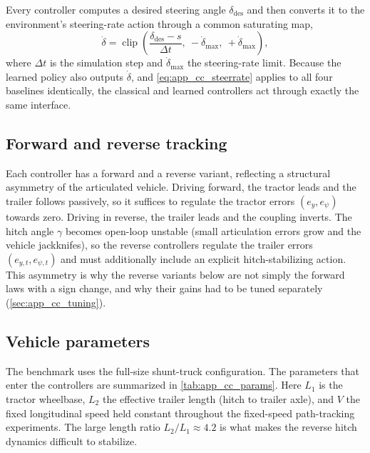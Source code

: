 Every controller computes a desired steering angle $\delta_{\mathrm{des}}$ and then
converts it to the environment's steering-rate action through a common saturating map,
\begin{equation}
    \dot{\delta} = \operatorname{clip}\!\left(\frac{\delta_{\mathrm{des}} - s}{\Delta t},\
    -\dot{\delta}_{\max},\ +\dot{\delta}_{\max}\right),
    \label{eq:app_cc_steerrate}
\end{equation}
where $\Delta t$ is the simulation step and $\dot{\delta}_{\max}$ the steering-rate limit.
Because the learned policy also outputs $\dot{\delta}$, and \cref{eq:app_cc_steerrate}
applies to all four baselines identically, the classical and learned controllers act
through exactly the same interface.

\subsection{Forward and reverse tracking}
\label{sec:app_cc_fwdrev}

Each controller has a forward and a reverse variant, reflecting a structural asymmetry of
the articulated vehicle. Driving forward, the tractor leads and the trailer follows
passively, so it suffices to regulate the tractor errors $(e_y, e_\psi)$ towards zero.
Driving in reverse, the trailer leads and the coupling inverts. The hitch angle
$\gamma$ becomes open-loop unstable (small articulation errors grow and the vehicle
jackknifes), so the reverse controllers regulate the trailer errors
$(e_{y,t}, e_{\psi,t})$ and must additionally include an explicit hitch-stabilizing action.
This asymmetry is why the reverse variants below are not simply the forward laws with a
sign change, and why their gains had to be tuned separately
(\cref{sec:app_cc_tuning}).

\subsection{Vehicle parameters}

The benchmark uses the full-size shunt-truck configuration. The parameters that enter the
controllers are summarized in \cref{tab:app_cc_params}. Here $L_1$ is the tractor
wheelbase, $L_2$ the effective trailer length (hitch to trailer axle), and $V$ the fixed
longitudinal speed held constant throughout the fixed-speed path-tracking experiments. The
large length ratio $L_2/L_1 \approx 4.2$ is what makes the reverse hitch dynamics
difficult to stabilize.

